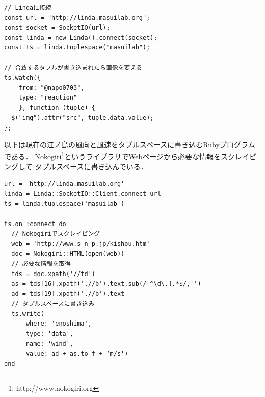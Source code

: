 \vspace{2mm}
\begin{lstlisting}
// Lindaに接続
const url = "http://linda.masuilab.org";
const socket = SocketIO(url);
const linda = new Linda().connect(socket);
const ts = linda.tuplespace("masuilab");

// 合致するタプルが書き込まれたら画像を変える
ts.watch({
    from: "@napo0703",
    type: "reaction"
    }, function (tuple) {
  $("img").attr("src", tuple.data.value);
};
\end{lstlisting}

以下は現在の江ノ島の風向と風速をタプルスペースに書き込むRubyプログラムである．
Nokogiri\footnote{http://www.nokogiri.org}というライブラリでWebページから必要な情報をスクレイピングして
タプルスペースに書き込んでいる．

\vspace{2mm}
\begin{lstlisting}
url = 'http://linda.masuilab.org'
linda = Linda::SocketIO::Client.connect url
ts = linda.tuplespace('masuilab')

ts.on :connect do
  // Nokogiriでスクレイピング
  web = 'http://www.s-n-p.jp/kishou.htm'
  doc = Nokogiri::HTML(open(web))
  // 必要な情報を取得
  tds = doc.xpath('//td')
  as = tds[16].xpath('.//b').text.sub(/[^\d\.].*$/,'')
  ad = tds[19].xpath('.//b').text
  // タプルスペースに書き込み
  ts.write(
      where: 'enoshima',
      type: 'data',
      name: 'wind',
      value: ad + as.to_f + ‘m/s')
end
\end{lstlisting}